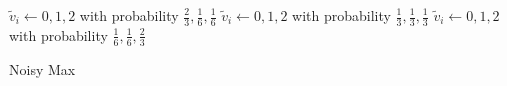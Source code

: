 

\begin{algorithm}
  \begin{algorithmic}[1]
                {$\tilde{v}_i \leftarrow 0, 1, 2$ with probability
                 $\frac{2}{3}, \frac{1}{6}, \frac{1}{6}$}
                {$\tilde{v}_i \leftarrow 0, 1, 2$ with probability
                 $\frac{1}{3}, \frac{1}{3}, \frac{1}{3}$}
                {$\tilde{v}_i \leftarrow 0, 1, 2$ with probability
                 $\frac{1}{6}, \frac{1}{6}, \frac{2}{3}$}
        \EndMatch
      \EndFor
    \EndProcedure
  \end{algorithmic}
  \caption{Noisy Max}
  \label{algorithm:noisy-max}
\end{algorithm}

